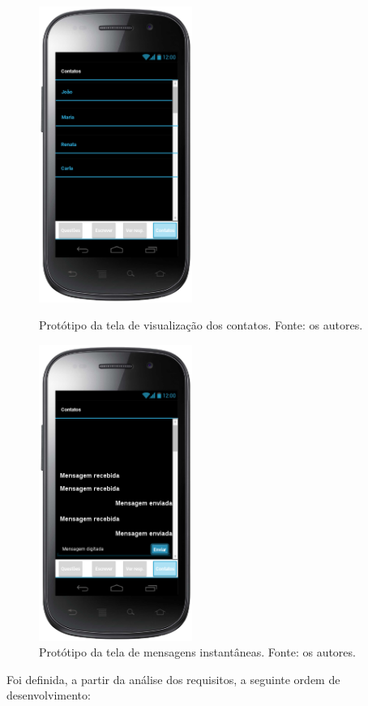 \begin{figure}
\centering
\begin{minipage}{0.45\textwidth}
\centering
\includegraphics[width=5cm]{protconversas.png}
\caption{Protótipo da tela de visualização dos contatos. Fonte: os autores.}
\label{fig:prot_conversas}
\end{minipage}\hfill
\begin{minipage}{0.45\textwidth}
\centering
\includegraphics[width=5cm]{prot_chat.png}
\caption{Protótipo da tela de mensagens instantâneas. Fonte: os autores.}
\label{fig:prot_chat}
\end{minipage}
\end{figure}

\FloatBarrier

Foi definida, a partir da análise dos requisitos, a seguinte ordem de desenvolvimento:

